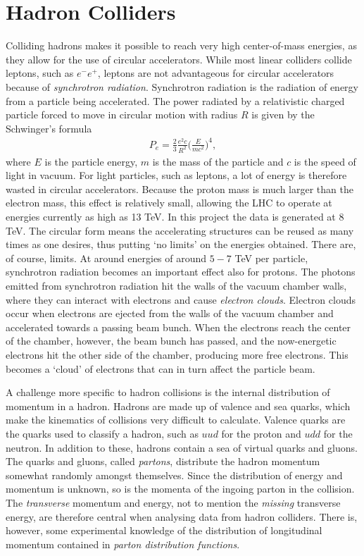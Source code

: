 \documentclass[twoside,english]{uiofysmaster}
\begin{document}
{\section{Hadron Colliders}\label{Sec:: susy hadron : Hadron Colliders}

Colliding hadrons makes it possible to reach very high center-of-mass energies, as they allow for the use of circular accelerators. While most linear colliders collide leptons, such as $e^- e^+$, leptons are not advantageous for circular accelerators because of \textit{synchrotron radiation}. Synchrotron radiation is the radiation of energy from a particle being accelerated. The power radiated by a relativistic charged particle forced to move in circular motion with radius $R$ is given by the Schwinger's formula \cite{Balerna2015}
\begin{align}
P_e = \frac{2}{3} \frac{e^2c }{R^2} \Bigg( \frac{E}{mc^2} \Bigg)^4,
\end{align}
where $E$ is the particle energy, $m$ is the mass of the particle and $c$ is the speed of light in vacuum. For light particles, such as leptons, a lot of energy is therefore wasted in circular accelerators. Because the proton mass is much larger than the electron mass, this effect is relatively small, allowing the LHC to operate at energies currently as high as 13 TeV. In this project the data is generated at $8$ TeV. The circular form means the accelerating structures can be reused as many times as one desires, thus putting `no limits' on the energies obtained. There are, of course, limits. At around energies of around $5-7$ TeV per particle, synchrotron radiation becomes an important effect also for protons. The photons emitted from synchrotron radiation hit the walls of the vacuum chamber walls, where they can interact with electrons and cause \textit{electron clouds}. Electron clouds occur when electrons are ejected from the walls of the vacuum chamber and accelerated towards a passing beam bunch. When the electrons reach the center of the chamber, however, the beam bunch has passed, and the now-energetic electrons hit the other side of the chamber, producing more free electrons. This becomes a `cloud' of electrons that can in turn affect the particle beam. 

A challenge more specific to hadron collisions is the internal distribution of momentum in a hadron. Hadrons are made up of valence and sea quarks, which make the kinematics of collisions very difficult to calculate. Valence quarks are the quarks used to classify a hadron, such as $uud$ for the proton and $udd$ for the neutron. In addition to these, hadrons contain a sea of virtual quarks and gluons. The quarks and gluons, called \textit{partons}, distribute the hadron momentum somewhat randomly amongst themselves. Since the distribution of energy and momentum is unknown, so is the momenta of the ingoing parton in the collision. The \textit{transverse} momentum and energy, not to mention the \textit{missing} transverse energy, are therefore central when analysing data from hadron colliders. There is, however, some experimental knowledge of the distribution of longitudinal momentum contained in \textit{parton distribution functions}.

}
\end{document}
